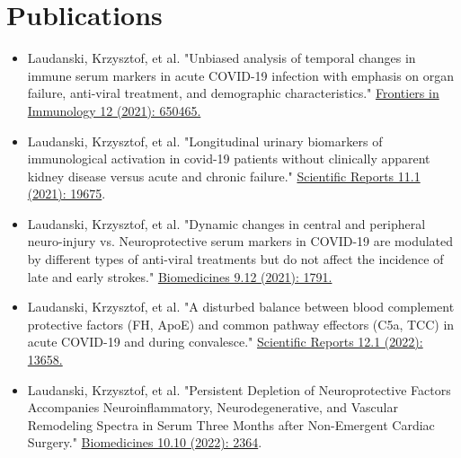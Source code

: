 \documentclass[letterpaper,11pt]{article}
\newcommand{\reusmeSubHeadingListSmallStart}{\begin{itemize}[itemsep=-4pt, parsep=4pt]}
\newcommand{\resumeSubHeadingListSmallEnd}{\end{itemize}}
\begin{document}

\section{Publications}

\reusmeSubHeadingListSmallStart
\item\small {
    Laudanski, Krzysztof, et al. "Unbiased analysis of temporal changes in immune serum
    markers in acute COVID-19 infection with emphasis on organ failure, anti-viral
    treatment, and demographic characteristics."
    \href{https://www.frontiersin.org/articles/10.3389/fimmu.2021.650465/full}
    {Frontiers in Immunology 12 (2021): 650465.}
}

\item\small {
    Laudanski, Krzysztof, et al. "Longitudinal urinary biomarkers of immunological
    activation in covid-19 patients without clinically apparent kidney disease versus
    acute and chronic failure."
    \href{https://www.nature.com/articles/s41598-021-99102-5.pdf?proof=tr}
    {Scientific Reports 11.1 (2021): 19675}.
}

\item\small {
    Laudanski, Krzysztof, et al. "Dynamic changes in central and peripheral neuro-injury
    vs. Neuroprotective serum markers in COVID-19 are modulated by different types of
    anti-viral treatments but do not affect the incidence of late and early strokes."
    \href{https://doi.org/10.3390/biomedicines9121791}
    {Biomedicines 9.12 (2021): 1791.}
}

\item\small {
    Laudanski, Krzysztof, et al. "A disturbed balance between blood complement protective
    factors (FH, ApoE) and common pathway effectors (C5a, TCC) in acute COVID-19 and
    during convalesce."
    \href{https://doi.org/10.1038/s41598-022-17011-7}
    {Scientific Reports 12.1 (2022): 13658.}
}

\item\small {
    Laudanski, Krzysztof, et al. "Persistent Depletion of Neuroprotective Factors
    Accompanies Neuroinflammatory, Neurodegenerative, and Vascular Remodeling Spectra in
    Serum Three Months after Non-Emergent Cardiac Surgery."
    \href{https://doi.org/10.3390/biomedicines10102364}
    {Biomedicines 10.10 (2022): 2364}.
}

\resumeSubHeadingListSmallEnd

\vspace{-20pt}
\end{document}
